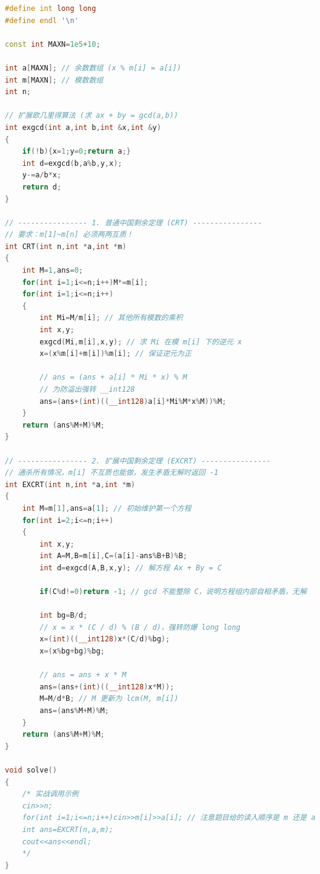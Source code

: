 \documentclass[10pt,landscape,a4paper]{article}
\begin{document}
\begin{multicols*}{3}
\begin{lstlisting}[language=C++]
#define int long long
#define endl '\n'

const int MAXN=1e5+10;

int a[MAXN]; // 余数数组 (x % m[i] = a[i])
int m[MAXN]; // 模数数组
int n;

// 扩展欧几里得算法 (求 ax + by = gcd(a,b))
int exgcd(int a,int b,int &x,int &y)
{
    if(!b){x=1;y=0;return a;}
    int d=exgcd(b,a%b,y,x);
    y-=a/b*x;
    return d;
}

// ---------------- 1. 普通中国剩余定理 (CRT) ----------------
// 要求：m[1]~m[n] 必须两两互质！
int CRT(int n,int *a,int *m)
{
    int M=1,ans=0;
    for(int i=1;i<=n;i++)M*=m[i];
    for(int i=1;i<=n;i++)
    {
        int Mi=M/m[i]; // 其他所有模数的乘积
        int x,y;
        exgcd(Mi,m[i],x,y); // 求 Mi 在模 m[i] 下的逆元 x
        x=(x%m[i]+m[i])%m[i]; // 保证逆元为正
        
        // ans = (ans + a[i] * Mi * x) % M
        // 为防溢出强转 __int128
        ans=(ans+(int)((__int128)a[i]*Mi%M*x%M))%M; 
    }
    return (ans%M+M)%M;
}

// ---------------- 2. 扩展中国剩余定理 (EXCRT) ----------------
// 通杀所有情况，m[i] 不互质也能做，发生矛盾无解时返回 -1
int EXCRT(int n,int *a,int *m)
{
    int M=m[1],ans=a[1]; // 初始维护第一个方程
    for(int i=2;i<=n;i++)
    {
        int x,y;
        int A=M,B=m[i],C=(a[i]-ans%B+B)%B;
        int d=exgcd(A,B,x,y); // 解方程 Ax + By = C
        
        if(C%d!=0)return -1; // gcd 不能整除 C，说明方程组内部自相矛盾，无解
        
        int bg=B/d;
        // x = x * (C / d) % (B / d)，强转防爆 long long
        x=(int)((__int128)x*(C/d)%bg);
        x=(x%bg+bg)%bg;
        
        // ans = ans + x * M
        ans=(ans+(int)((__int128)x*M));
        M=M/d*B; // M 更新为 lcm(M, m[i])
        ans=(ans%M+M)%M;
    }
    return (ans%M+M)%M;
}

void solve()
{
    /* 实战调用示例
    cin>>n;
    for(int i=1;i<=n;i++)cin>>m[i]>>a[i]; // 注意题目给的读入顺序是 m 还是 a
    int ans=EXCRT(n,a,m);
    cout<<ans<<endl;
    */
}
\end{lstlisting}

\end{multicols*}
\end{document}
